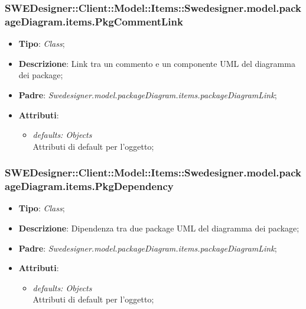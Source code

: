 \documentclass[../DefinizioneDiProdotto.tex]{subfiles}
\begin{document}
			\subsubsection{SWEDesigner::Client::Model::Items::Swedesigner.model.packageDiagram.items.PkgCommentLink}
			\hypertarget{SWEDesigner::Client::Model::Items::Swedesigner.model.packageDiagram.items.PkgCommentLink}{}
			\begin{itemize}
				\item \textbf{Tipo}: \emph{Class};
				\item \textbf{Descrizione}: Link tra un commento e un componente UML del diagramma dei package;
				\item \textbf{Padre}: \emph{Swedesigner.model.packageDiagram.items.packageDiagramLink};
				\item \textbf{Attributi}:
				\begin{itemize}
					\item \emph{defaults: Objects}\\
					Attributi di default per l'oggetto;
				\end{itemize}
			\end{itemize}
			
			\subsubsection{SWEDesigner::Client::Model::Items::Swedesigner.model.packageDiagram.items.PkgDependency}
			\hypertarget{SWEDesigner::Client::Model::Items::Swedesigner.model.packageDiagram.items.PkgDependency}{}
			\begin{itemize}
				\item \textbf{Tipo}: \emph{Class};
				\item \textbf{Descrizione}: Dipendenza tra due package UML del diagramma dei package;
				\item \textbf{Padre}: \emph{Swedesigner.model.packageDiagram.items.packageDiagramLink};
				\item \textbf{Attributi}:
				\begin{itemize}
					\item \emph{defaults: Objects}\\
					Attributi di default per l'oggetto;
				\end{itemize}
			\end{itemize}
			
			
\end{document}
